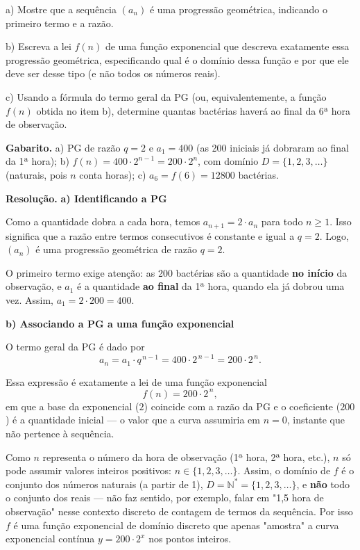 \documentclass[11pt,a4paper]{article}
\begin{document}
a) Mostre que a sequência $(a_n)$ é uma progressão geométrica, indicando o primeiro termo e a razão.

b) Escreva a lei $f(n)$ de uma função exponencial que descreva exatamente essa progressão geométrica, especificando qual é o domínio dessa função e por que ele deve ser desse tipo (e não todos os números reais).

c) Usando a fórmula do termo geral da PG (ou, equivalentemente, a função $f(n)$ obtida no item b), determine quantas bactérias haverá ao final da 6ª hora de observação.

\textbf{Gabarito.} a) PG de razão $q=2$ e $a_1=400$ (as 200 iniciais já dobraram ao final da 1ª hora); b) $f(n)=400\cdot 2^{n-1}=200\cdot 2^{n}$, com domínio $D=\{1,2,3,\dots\}$ (naturais, pois $n$ conta horas); c) $a_6 = f(6) = 12800$ bactérias.

\textbf{Resolução.} \textbf{a) Identificando a PG}

Como a quantidade dobra a cada hora, temos $a_{n+1} = 2\cdot a_n$ para todo $n \geq 1$. Isso significa que a razão entre termos consecutivos é constante e igual a $q = 2$. Logo, $(a_n)$ é uma progressão geométrica de razão $q=2$.

O primeiro termo exige atenção: as 200 bactérias são a quantidade \textbf{no início} da observação, e $a_1$ é a quantidade \textbf{ao final} da 1ª hora, quando ela já dobrou uma vez. Assim, $a_1 = 2 \cdot 200 = 400$.

\textbf{b) Associando a PG a uma função exponencial}

O termo geral da PG é dado por
$$a_n = a_1 \cdot q^{\,n-1} = 400 \cdot 2^{\,n-1} = 200 \cdot 2^{\,n}.$$

Essa expressão é exatamente a lei de uma função exponencial
$$f(n) = 200 \cdot 2^{\,n},$$
em que a base da exponencial ($2$) coincide com a razão da PG e o coeficiente ($200$) é a quantidade inicial — o valor que a curva assumiria em $n = 0$, instante que não pertence à sequência.

Como $n$ representa o número da hora de observação (1ª hora, 2ª hora, etc.), $n$ só pode assumir valores inteiros positivos: $n \in \{1, 2, 3, \dots\}$. Assim, o domínio de $f$ é o conjunto dos números naturais (a partir de 1), $D = \mathbb{N}^* = \{1,2,3,\dots\}$, e \textbf{não} todo o conjunto dos reais — não faz sentido, por exemplo, falar em "1,5 hora de observação" nesse contexto discreto de contagem de termos da sequência. Por isso $f$ é uma função exponencial de domínio discreto que apenas "amostra" a curva exponencial contínua $y = 200\cdot 2^{x}$ nos pontos inteiros.
\end{document}
